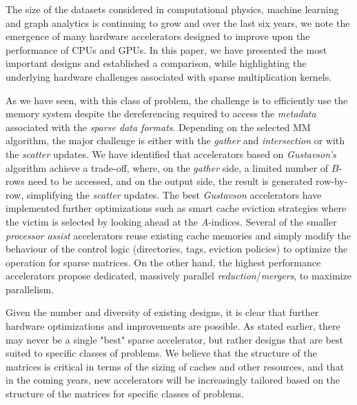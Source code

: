 The size of the datasets considered in computational physics, machine learning and graph analytics is continuing to grow and over the last six years, we note the emergence of many hardware accelerators designed to improve upon the performance of CPUs and GPUs. In this paper, we have presented the most important designs and established a comparison, while highlighting the underlying hardware challenges associated with sparse multiplication kernels.

As we have seen, with this class of problem, the challenge is to efficiently use the memory system despite the dereferencing required to access the \emph{metadata} associated with the \emph{sparse data formats}. Depending on the selected MM algorithm, the major challenge is either with the \emph{gather} and \emph{intersection} or with the \emph{scatter} updates. We have identified that accelerators based on \emph{Gustavson's} algorithm achieve a trade-off, where, on the \emph{gather} side, a limited number of $B$-rows need to be accessed, and on the output side, the result is generated row-by-row, simplifying the \emph{scatter} updates. The best \emph{Gustavson} accelerators have implemented further optimizations such as smart cache eviction strategies where the victim is selected by looking ahead at the $A$-indices. Several of the smaller \emph{processor assist} accelerators reuse existing cache memories and simply modify the behaviour of the control logic (directories, tags, eviction policies) to optimize the operation for sparse matrices. On the other hand, the highest performance accelerators propose dedicated, massively parallel \emph{reduction}/\emph{mergers}, to maximize parallelism.

Given the number and diversity of existing designs, it is clear that further hardware optimizations and improvements are possible. As stated earlier, there may never be a single "best" sparse accelerator, but rather designs that are best suited to specific classes of problems. We believe that the structure of the matrices is critical in terms of the sizing of caches and other resources, and that in the coming years, new accelerators will be increasingly tailored based on the structure of the matrices for specific classes of problems.

